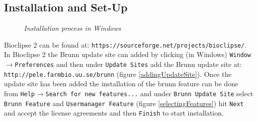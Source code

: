 \documentclass[a4paper,10pt]{article}
\begin{document}
         \subsection{Installation and Set-Up}

         \begin{figure}
           \caption{\textit{Installation process in Windows}} 
         \end{figure}

            Bioclipse 2 can be found at:
            \texttt{https://sourceforge.net/projects/bioclipse/}. In Bioclipse
            2 the Brunn update site can added by clicking (in Windows)
            \texttt{Window$\rightarrow$Preferences} and then under
            \texttt{Update Sites} add the Brunn update site at:
            \texttt{http://pele.farmbio.uu.se/brunn} (figure
            \ref{addingUpdateSite}). Once the update site has been added the
            installation of the brunn feature can be done from
            \texttt{Help$\rightarrow$Search for new features...} and under
            \texttt{Brunn Update Site} select \texttt{Brunn Feature} and
            \texttt{Usermanager Feature} (figure \ref{selectingFeatures}) hit
            \texttt{Next} and accept the license agreements and then
            \texttt{Finish} to start installation. 
\end{document}

